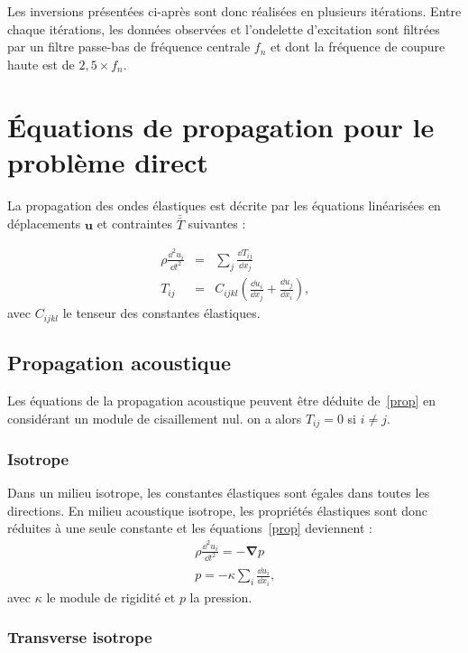 Les inversions présentées ci-après sont donc réalisées en plusieurs itérations. Entre chaque itérations, les données observées et l'ondelette d'excitation sont filtrées par un filtre passe-bas de fréquence centrale $f_{n}$ et dont la fréquence de coupure haute est de $2,5 \times f_{n}$.


\section{Équations de propagation pour le problème direct}

La propagation des ondes élastiques est décrite par les équations linéarisées en déplacements $\bm{u}$ et contraintes $\bar{\bar T}$ suivantes \citep{mat_ac} : 

\begin{eqnarray}
	\rho \frac{\dd^2 u_{i}}{\dd t^2} &=& \displaystyle\sum_{j}\frac{\dd T_{ij}}{\dd x_{j}}\\
	T_{ij}&=&C_{ijkl}\left( \frac{\dd u_{i}}{\dd x_{j}} + \frac{\dd u_{j}}{\dd x_{i}}\right)\text{,}
	\label{prop}
\end{eqnarray}
avec $C_{ijkl}$ le tenseur des constantes élastiques.

\subsection{Propagation acoustique}
Les équations de la propagation acoustique peuvent être déduite de~\ref{prop} en considérant un module de cisaillement nul. on a alors $T_{ij}=0$ si $i\neq j$.

\subsubsection{Isotrope}
Dans un milieu isotrope, les constantes élastiques sont égales dans toutes les directions. En milieu acoustique isotrope, les propriétés élastiques sont donc réduites à une seule constante et les équations~\ref{prop} deviennent : 
\begin{eqnarray}
	\rho \frac{\dd^2 u_{i}}{\dd t^2} = -\bm{\nabla} p\\
	p=-\kappa \displaystyle\sum_{i} \frac{\dd u_{i}}{\dd x_{i}}\text{,}
\end{eqnarray}
avec $\kappa$ le module de rigidité et $p$ la pression.

\subsubsection{Transverse isotrope}

